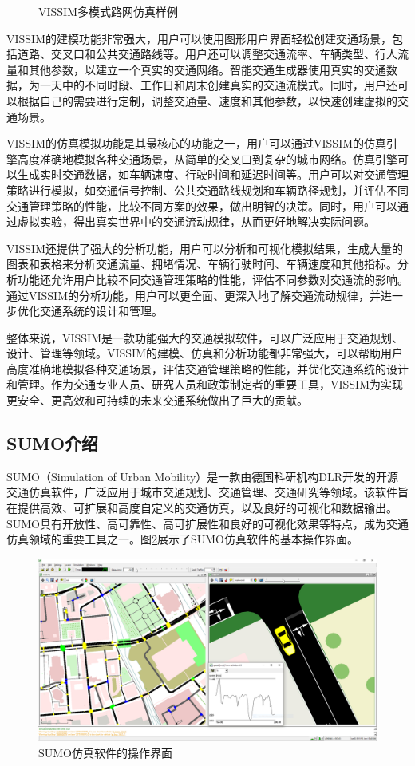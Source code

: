 \begin{figure}[htbp]
  \quad\quad
  \caption{VISSIM多模式路网仿真样例}
  \label{VISSIM}
\end{figure}

VISSIM的建模功能非常强大，用户可以使用图形用户界面轻松创建交通场景，包括道路、交叉口和公共交通路线等。用户还可以调整交通流率、车辆类型、行人流量和其他参数，以建立一个真实的交通网络。智能交通生成器使用真实的交通数据，为一天中的不同时段、工作日和周末创建真实的交通流模式。同时，用户还可以根据自己的需要进行定制，调整交通量、速度和其他参数，以快速创建虚拟的交通场景。

VISSIM的仿真模拟功能是其最核心的功能之一，用户可以通过VISSIM的仿真引擎高度准确地模拟各种交通场景，从简单的交叉口到复杂的城市网络。仿真引擎可以生成实时交通数据，如车辆速度、行驶时间和延迟时间等。用户可以对交通管理策略进行模拟，如交通信号控制、公共交通路线规划和车辆路径规划，并评估不同交通管理策略的性能，比较不同方案的效果，做出明智的决策。同时，用户可以通过虚拟实验，得出真实世界中的交通流动规律，从而更好地解决实际问题。

VISSIM还提供了强大的分析功能，用户可以分析和可视化模拟结果，生成大量的图表和表格来分析交通流量、拥堵情况、车辆行驶时间、车辆速度和其他指标。分析功能还允许用户比较不同交通管理策略的性能，评估不同参数对交通流的影响。通过VISSIM的分析功能，用户可以更全面、更深入地了解交通流动规律，并进一步优化交通系统的设计和管理。

整体来说，VISSIM是一款功能强大的交通模拟软件，可以广泛应用于交通规划、设计、管理等领域。VISSIM的建模、仿真和分析功能都非常强大，可以帮助用户高度准确地模拟各种交通场景，评估交通管理策略的性能，并优化交通系统的设计和管理。作为交通专业人员、研究人员和政策制定者的重要工具，VISSIM为实现更安全、更高效和可持续的未来交通系统做出了巨大的贡献。


\subsection{SUMO介绍}

SUMO（Simulation of Urban Mobility）是一款由德国科研机构DLR开发的开源交通仿真软件，广泛应用于城市交通规划、交通管理、交通研究等领域。该软件旨在提供高效、可扩展和高度自定义的交通仿真，以及良好的可视化和数据输出。SUMO具有开放性、高可靠性、高可扩展性和良好的可视化效果等特点，成为交通仿真领域的重要工具之一。图\ref{SUMO}展示了SUMO仿真软件的基本操作界面。
\begin{figure}[htbp]
  \centering
  \includegraphics[width=.7\linewidth]{figures/content/sumo.png}
  \caption{SUMO仿真软件的操作界面}
  \label{SUMO}
\end{figure}



